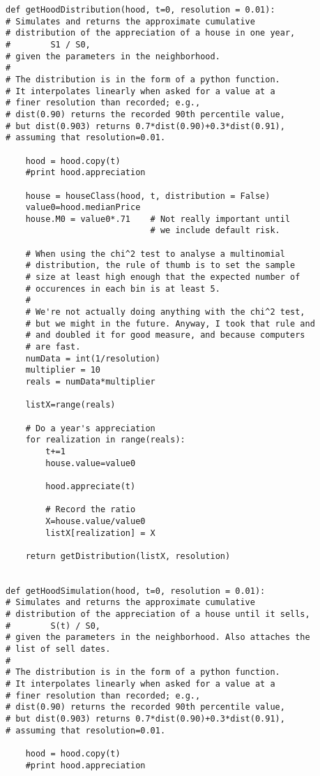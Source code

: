 \begin{lstlisting}
def getHoodDistribution(hood, t=0, resolution = 0.01):
# Simulates and returns the approximate cumulative
# distribution of the appreciation of a house in one year,
#        S1 / S0,
# given the parameters in the neighborhood.
#
# The distribution is in the form of a python function.
# It interpolates linearly when asked for a value at a
# finer resolution than recorded; e.g.,
# dist(0.90) returns the recorded 90th percentile value,
# but dist(0.903) returns 0.7*dist(0.90)+0.3*dist(0.91),
# assuming that resolution=0.01.

    hood = hood.copy(t)
    #print hood.appreciation

    house = houseClass(hood, t, distribution = False)
    value0=hood.medianPrice
    house.M0 = value0*.71    # Not really important until
                             # we include default risk.

    # When using the chi^2 test to analyse a multinomial
    # distribution, the rule of thumb is to set the sample
    # size at least high enough that the expected number of
    # occurences in each bin is at least 5.
    #
    # We're not actually doing anything with the chi^2 test,
    # but we might in the future. Anyway, I took that rule and
    # and doubled it for good measure, and because computers
    # are fast.
    numData = int(1/resolution)
    multiplier = 10
    reals = numData*multiplier

    listX=range(reals)
    
    # Do a year's appreciation
    for realization in range(reals):
        t+=1
        house.value=value0

        hood.appreciate(t)

        # Record the ratio
        X=house.value/value0
        listX[realization] = X

    return getDistribution(listX, resolution)


def getHoodSimulation(hood, t=0, resolution = 0.01):
# Simulates and returns the approximate cumulative
# distribution of the appreciation of a house until it sells,
#        S(t) / S0,
# given the parameters in the neighborhood. Also attaches the
# list of sell dates.
#
# The distribution is in the form of a python function.
# It interpolates linearly when asked for a value at a
# finer resolution than recorded; e.g.,
# dist(0.90) returns the recorded 90th percentile value,
# but dist(0.903) returns 0.7*dist(0.90)+0.3*dist(0.91),
# assuming that resolution=0.01.

    hood = hood.copy(t)
    #print hood.appreciation


\end{lstlisting}
